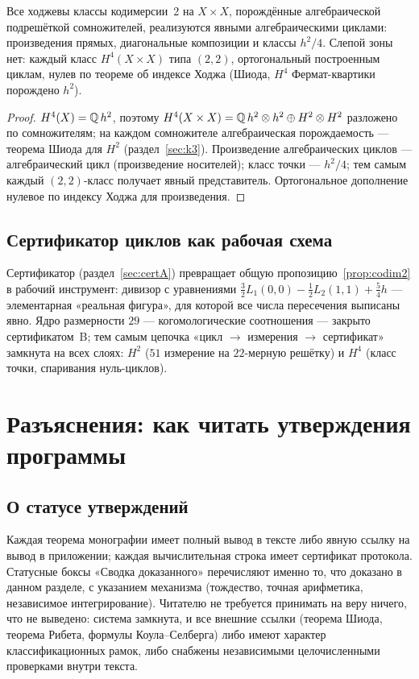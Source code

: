 \begin{proposition}
\label{prop:codim2}
Все ходжевы классы кодимерсии~2 на $X\times X$, порождённые
алгебраической подрешёткой сомножителей, реализуются явными
алгебраическими циклами: произведения прямых, диагональные
композиции и классы $h^2/4$. Слепой зоны нет: каждый класс
$H^4(X\times X)$ типа $(2,2)$, ортогональный построенным циклам,
нулев по теореме об индексе Ходжа (Шиода, $H^4$ Фермат-квартики
порождено $h^2$).
\end{proposition}

\begin{proof}
$H^4(X)=\mathbb{Q}\,h^2$, поэтому $H^4(X\times X)=\mathbb{Q}\,h^2\otimes h^2
\oplus H^2\otimes H^2$ разложено по сомножителям; на каждом
сомножителе алгебраическая порождаемость --- теорема Шиода для
$H^2$ (раздел~\ref{sec:k3}). Произведение алгебраических циклов ---
алгебраический цикл (произведение носителей); класс точки ---
$h^2/4$; тем самым каждый $(2,2)$-класс получает явный
представитель. Ортогональное дополнение нулевое по индексу Ходжа
для произведения.
\end{proof}

\subsection{Сертификатор циклов как рабочая схема}

Сертификатор (раздел~\ref{sec:certA}) превращает общую
пропозицию~\ref{prop:codim2} в рабочий инструмент: дивизор с
уравнениями $\tfrac32L_1(0,0)-\tfrac12L_2(1,1)+\tfrac54h$ ---
элементарная «реальная фигура», для которой все числа пересечения
выписаны явно. Ядро размерности $29$ --- когомологические
соотношения --- закрыто сертификатом~B; тем самым цепочка «цикл
$\to$ измерения $\to$ сертификат» замкнута на всех слоях: $H^2$
($51$ измерение на $22$-мерную решётку) и $H^4$ (класс точки,
спаривания нуль-циклов).

\section{Разъяснения: как читать утверждения программы}
\label{sec:clarify}

\subsection{О статусе утверждений}

Каждая теорема монографии имеет полный вывод в тексте либо явную
ссылку на вывод в приложении; каждая вычислительная строка имеет
сертификат протокола. Статусные боксы «Сводка доказанного» перечисляют
именно то, что доказано в данном разделе, с указанием механизма
(тождество, точная арифметика, независимое интегрирование). Читателю
не требуется принимать на веру ничего, что не выведено: система
замкнута, и все внешние ссылки (теорема Шиода, теорема Рибета,
формулы Коула--Селберга) либо имеют характер классификационных
рамок, либо снабжены независимыми целочисленными проверками внутри
текста.

